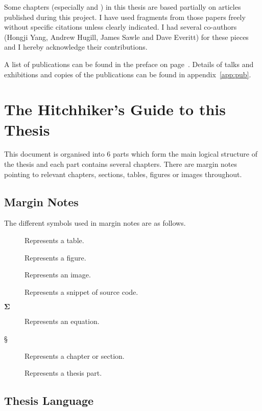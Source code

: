 Some chapters (especially  and ) in this thesis are based partially on articles published during this project. I have used fragments from those papers freely without specific citations unless clearly indicated. I had several co-authors (Hongji Yang, Andrew Hugill, James Sawle and Dave Everitt) for these pieces and I hereby acknowledge their contributions.

A list of publications can be found in the preface on page~\pageref{pre:pub}. Details of talks and exhibitions and copies of the publications can be found in appendix~\ref{app:pub}.


\section{The Hitchhiker's Guide to this Thesis}

This document is organised into \num{6} parts which form the main logical structure of the thesis and each part contains several chapters. There are margin notes pointing to relevant chapters, sections, tables, figures or images throughout.


\subsection{Margin Notes}

The different symbols used in margin notes are as follows.

\begin{description}
  \item [] Represents a table.
  \item [] Represents a figure.
  \item [] Represents an image.
  \item [] Represents a snippet of source code.
  \item [$\bm{\Sigma}$] Represents an equation.
  \item [§] Represents a chapter or section.
  \item [\textspiral] Represents a thesis part.
\end{description}


\subsection{Thesis Language}

